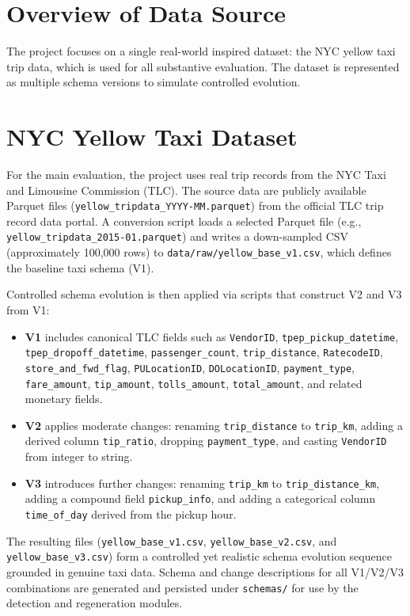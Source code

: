 \section{Overview of Data Source}

The project focuses on a single real-world inspired dataset: the NYC yellow
taxi trip data, which is used for all substantive evaluation. The dataset is
represented as multiple schema versions to simulate controlled evolution.

\section{NYC Yellow Taxi Dataset}

For the main evaluation, the project uses real trip records from the NYC Taxi
and Limousine Commission (TLC). The source data are publicly available
Parquet files (\texttt{yellow\_tripdata\_YYYY-MM.parquet}) from the official
TLC trip record data portal. A conversion script loads a selected Parquet file
(e.g., \texttt{yellow\_tripdata\_2015-01.parquet}) and writes a down-sampled
CSV (approximately 100{,}000 rows) to \texttt{data/raw/yellow\_base\_v1.csv},
which defines the baseline taxi schema (V1).

Controlled schema evolution is then applied via scripts that construct V2 and
V3 from V1:
%
\begin{itemize}
  \item \textbf{V1} includes canonical TLC fields such as \texttt{VendorID},
  \texttt{tpep\_pickup\_datetime}, \texttt{tpep\_dropoff\_datetime},
  \texttt{passenger\_count}, \texttt{trip\_distance}, \texttt{RatecodeID},
  \texttt{store\_and\_fwd\_flag}, \texttt{PULocationID}, \texttt{DOLocationID},
  \texttt{payment\_type}, \texttt{fare\_amount}, \texttt{tip\_amount},
  \texttt{tolls\_amount}, \texttt{total\_amount}, and related monetary fields.
  \item \textbf{V2} applies moderate changes: renaming \texttt{trip\_distance}
  to \texttt{trip\_km}, adding a derived column \texttt{tip\_ratio}, dropping
  \texttt{payment\_type}, and casting \texttt{VendorID} from integer to string.
  \item \textbf{V3} introduces further changes: renaming \texttt{trip\_km} to
  \texttt{trip\_distance\_km}, adding a compound field \texttt{pickup\_info}, and
  adding a categorical column \texttt{time\_of\_day} derived from the pickup
  hour.
\end{itemize}

The resulting files (\texttt{yellow\_base\_v1.csv}, \texttt{yellow\_base\_v2.csv},
and \texttt{yellow\_base\_v3.csv}) form a controlled yet realistic schema
evolution sequence grounded in genuine taxi data. Schema and change descriptions
for all V1/V2/V3 combinations are generated and persisted under
\texttt{schemas/} for use by the detection and regeneration modules.
